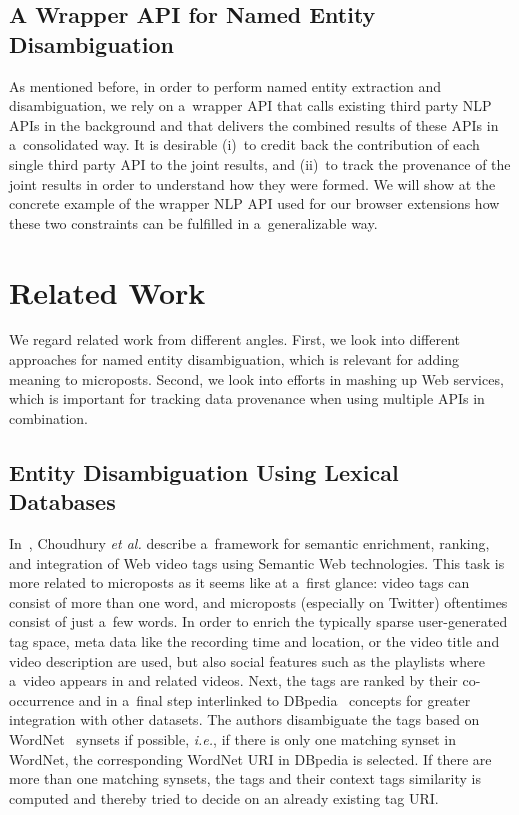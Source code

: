 \subsection{A Wrapper API for Named Entity Disambiguation}

As mentioned before, in order to perform named entity extraction
and disambiguation, we rely on a~wrapper API
that calls existing third party NLP APIs in the background
and that delivers the combined results of these APIs
in a~consolidated way.
It is  desirable
(i)~to credit back the contribution of each single third party API
to the joint results, and
(ii)~to track the provenance of the joint results
in order to understand how they were formed.
We will show at the concrete example of the wrapper NLP API
used for our browser extensions how these two constraints
can be fulfilled in a~generalizable way.

\section{Related Work}\label{sec:related}

We regard related work from different angles.
First, we look into different approaches
for named entity disambiguation,
which is relevant for adding meaning to microposts.
Second, we look into efforts in mashing up Web services,
which is important for tracking data provenance
when using multiple APIs in combination.

\subsection{Entity Disambiguation Using Lexical Databases}

In~\cite{choudhury2009youtubetags},
Choudhury \emph{et al.} describe a~framework for
semantic enrichment, ranking, and integration
of Web video tags using Semantic Web technologies.
This task is more related to microposts
as it seems like at a~first glance:
video tags can consist of more than one word,
and microposts (especially on Twitter) oftentimes consist
of just a~few words.
In order to enrich the typically sparse
user-generated tag space,
meta data like the recording time and location,
or the video title and video description are used,
but also social features such as the playlists
where a~video appears in and related videos.
Next, the tags are ranked by their co-occurrence
and in a~final step interlinked to DBpedia~\cite{auer2007dbpedia}
concepts for greater integration with other datasets.
The authors disambiguate the tags based on
WordNet~\cite{miller1995wordnet,fellbaum1998wordnet}
synsets if possible, \emph{i.e.},
if there is only one matching synset in WordNet,
the corresponding WordNet URI in DBpedia is selected.
If there are more than one matching synsets,
the tags and their context tags similarity is computed
and thereby tried to decide on an already existing tag URI.

